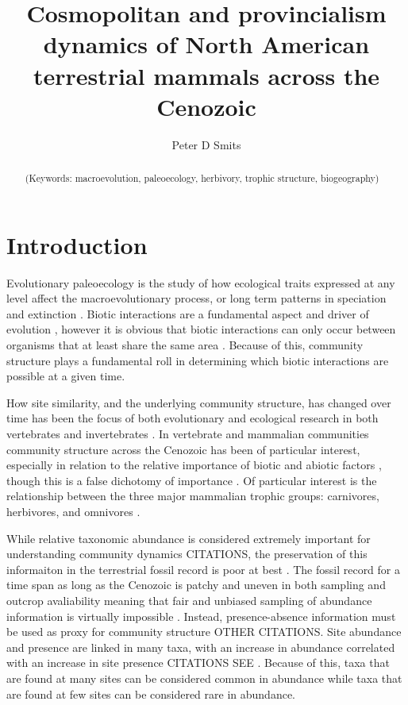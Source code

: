 \documentclass[12pt,letterpaper]{article}
\title{Cosmopolitan and provincialism dynamics of North American terrestrial mammals across the Cenozoic}
\author[1]{Peter D Smits}
\affil[1]{Committee on Evolutionary Biology, University of Chicago}
\begin{document}
\maketitle

\linenumbers
\modulolinenumbers[2]

\begin{abstract}
  \noindent (Keywords: macroevolution, paleoecology, herbivory, trophic structure, biogeography)
\end{abstract}

\section{Introduction}
Evolutionary paleoecology is the study of how ecological traits expressed at any level affect the macroevolutionary process, or long term patterns in speciation and extinction \citep{Kitchell1985a}. 
Biotic interactions are a fundamental aspect and driver of evolution \citep{VanValen1973,Liow2011a}, however it is obvious that biotic interactions can only occur between organisms that at least share the same area \citep{Roopnarine2010,Roopnarine2006}.
Because of this, community structure plays a fundamental roll in determining which biotic interactions are possible at a given time. 

How site similarity, and the underlying community structure, has changed over time has been the focus of both evolutionary and ecological research in both vertebrates and invertebrates \citep{Jernvall2002,Jernvall2004,Raia2006,Clapham2012,Olszewski2009,Olszewski2004}. In vertebrate and mammalian communities community structure across the Cenozoic has been of particular interest, especially in relation to the relative importance of biotic and abiotic factors \citep{Jernvall2002,Jernvall2004,Alroy1996a,Alroy1998a,Badgley2013,Barnosky2003,Blois2009,Figueirido2012}, though this is a false dichotomy of importance \citep{Liow2011a}. Of particular interest is the relationship between the three major mammalian trophic groups: carnivores, herbivores, and omnivores \citep{Jernvall2004,Price2012}.

While relative taxonomic abundance is considered extremely important for understanding community dynamics CITATIONS, the preservation of this informaiton in the terrestrial fossil record is poor at best \citep{Damuth1982}. The fossil record for a time span as long as the Cenozoic is patchy and uneven in both sampling and outcrop avaliability \citep{Jernvall2004,Alroy1996a,Alroy1998a} meaning that fair and unbiased sampling of abundance information is virtually impossible \citep{Damuth1982}. Instead, presence-absence information must be used as proxy for community structure \citep{Jernvall2004}OTHER CITATIONS. Site abundance and presence are linked in many taxa, with an increase in abundance correlated with an increase in site presence CITATIONS SEE \citep{Jernvall2004}. Because of this, taxa that are found at many sites can be considered common in abundance while taxa that are found at few sites can be considered rare in abundance.
\end{document}
